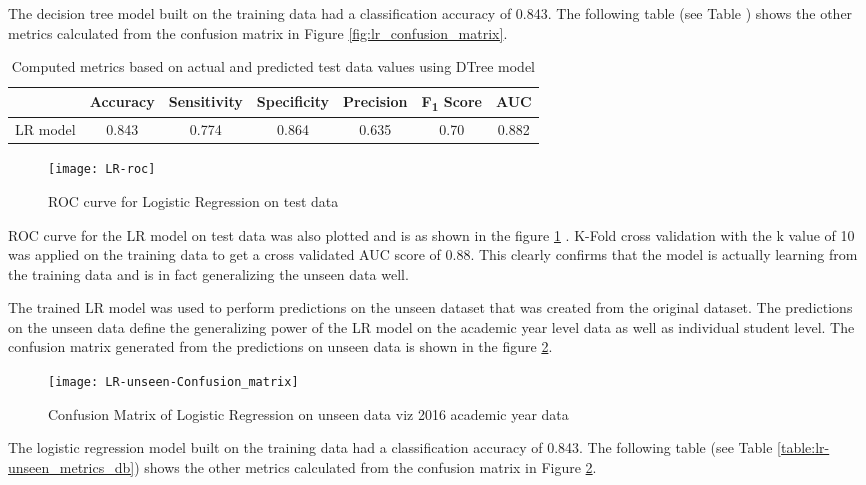\documentclass[11pt,openright]{report}
\begin{document}
The decision tree model built on the training data had a classification accuracy of 0.843. The following table (see Table ) shows the other metrics calculated from the confusion matrix in Figure \ref{fig:lr_confusion_matrix}. 
\begin{table}
	\renewcommand{\arraystretch}{1.3}
	\caption{Computed metrics based on actual and predicted test data values using DTree model}
	\label{table:lr-metrics_db}
	\centering
	\begin{tabular}{|c|c|c|c|c|c|c|}
    \hline
  	 & \bfseries Accuracy & \bfseries Sensitivity & \bfseries Specificity & \bfseries Precision & \bfseries F\textsubscript{1} Score  & \bfseries AUC\\  
    \hline
	LR model & 0.843 & 0.774 & 0.864 & 0.635 & 0.70 & 0.882 \\ \hline
	\end{tabular} 
\end{table}


 \begin{figure}[!htbp]
	\centering
	\texttt{[image: LR-roc]}
	\caption{ROC curve for Logistic Regression on test data}
	\label{fig:lr_roc}
\end{figure} 

ROC curve for the LR model on test data was also plotted  and is as shown in the figure \ref{fig:lr_roc} . K-Fold cross validation with the k value of 10 was applied on the training data to get a cross validated AUC score of 0.88. This clearly confirms that the model is actually learning from the training data and is in fact generalizing the unseen data well.

The trained LR model was used to perform predictions on the unseen dataset that was created from the original dataset. The predictions on the unseen data define the generalizing power of the LR model on the academic year level data as well as individual student level. The confusion matrix generated from the predictions on unseen data is shown in the figure \ref{fig:lr_unseen_confusion_matrix}.

  \begin{figure}[!htbp]
	\centering
	\texttt{[image: LR-unseen-Confusion\_matrix]}
	\caption{Confusion Matrix of Logistic Regression on unseen data viz 2016 academic year data}
	\label{fig:lr_unseen_confusion_matrix}
\end{figure} 


The logistic regression model built on the training data had a classification accuracy of 0.843. The following table (see Table \ref{table:lr-unseen_metrics_db}) shows the other metrics calculated from the confusion matrix in Figure \ref{fig:lr_unseen_confusion_matrix}.
\end{document}
